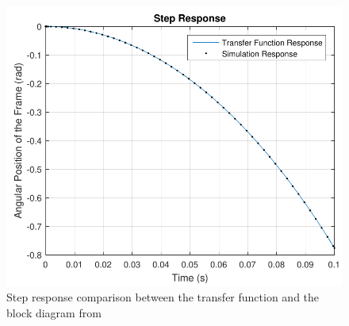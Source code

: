 \begin{figure}[H] 
	\centering 
	\includegraphics[scale=0.55]{figures/stepComparison}
	\centering
	\captionsetup{justification=centering}	
	\caption{Step response comparison between the transfer function and the block diagram from }
	\label{stepComparison}
\end{figure}